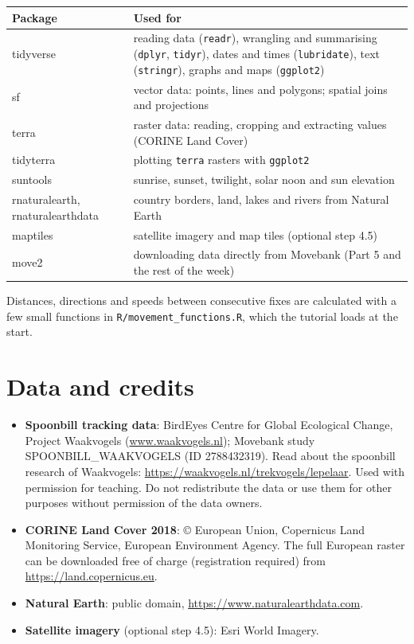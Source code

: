 \documentclass[11pt,a4paper]{article}
\begin{document}
\renewcommand{\arraystretch}{1.2}
\begin{tabularx}{\linewidth}{@{}>{\ttfamily\raggedright}p{4.2cm}>{\raggedright\arraybackslash}X@{}}
\toprule
\textrm{\textbf{Package}} & \textbf{Used for} \\
\midrule
tidyverse & reading data (\texttt{readr}), wrangling and summarising (\texttt{dplyr}, \texttt{tidyr}), dates and times (\texttt{lubridate}), text (\texttt{stringr}), graphs and maps (\texttt{ggplot2}) \\
sf & vector data: points, lines and polygons; spatial joins and projections \\
terra & raster data: reading, cropping and extracting values (CORINE Land Cover) \\
tidyterra & plotting \texttt{terra} rasters with \texttt{ggplot2} \\
suntools & sunrise, sunset, twilight, solar noon and sun elevation \\
rnaturalearth, rnaturalearthdata & country borders, land, lakes and rivers from Natural Earth \\
maptiles & satellite imagery and map tiles (optional step 4.5) \\
move2 & downloading data directly from Movebank (Part 5 and the rest of the week) \\
\bottomrule
\end{tabularx}

Distances, directions and speeds between consecutive fixes are calculated with a few small functions in \texttt{R/movement\_functions.R}, which the tutorial loads at the start.

\section{Data and credits}

\begin{itemize}[leftmargin=*]
\item \textbf{Spoonbill tracking data}: BirdEyes Centre for Global Ecological Change, Project Waakvogels (\href{https://www.waakvogels.nl}{www.waakvogels.nl}); Movebank study SPOONBILL\_WAAKVOGELS (ID 2788432319). Read about the spoonbill research of Waakvogels: \url{https://waakvogels.nl/trekvogels/lepelaar}. Used with permission for teaching. Do not redistribute the data or use them for other purposes without permission of the data owners.
\item \textbf{CORINE Land Cover 2018}: © European Union, Copernicus Land Monitoring Service, European Environment Agency. The full European raster can be downloaded free of charge (registration required) from \url{https://land.copernicus.eu}.
\item \textbf{Natural Earth}: public domain, \url{https://www.naturalearthdata.com}.
\item \textbf{Satellite imagery} (optional step 4.5): Esri World Imagery.
\end{itemize}
\end{document}
